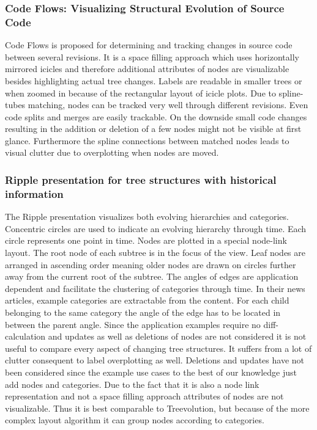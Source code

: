 \subsubsection{Code Flows: Visualizing Structural Evolution of Source Code\cite{telea2008code}}
Code Flows is proposed for determining and tracking changes in source code between several revisions. It is a space filling approach which uses horizontally mirrored icicles and therefore additional attributes of nodes are visualizable besides highlighting actual tree changes. Labels are readable in smaller trees or when zoomed in because of the rectangular layout of icicle plots. Due to spline-tubes matching, nodes can be tracked very well through different revisions. Even code splits and merges are easily trackable. On the downside small code changes resulting in the addition or deletion of a few nodes might not be visible at first glance. Furthermore the spline connections between matched nodes leads to visual clutter due to overplotting when nodes are moved.


\subsubsection{Ripple presentation for tree structures with historical information\cite{ishihara2006ripple}}
The Ripple presentation visualizes both evolving hierarchies and categories. Concentric circles are used to indicate an evolving hierarchy through time. Each circle represents one point in time. Nodes are plotted in a special node-link layout. The root node of each subtree is in the focus of the view. Leaf nodes are arranged in ascending order meaning older nodes are drawn on circles further away from the current root of the subtree. The angles of edges are application dependent and facilitate the clustering of categories through time. In their news articles, example categories are extractable from the content. For each child belonging to the same category the angle of the edge has to be located in between the parent angle. Since the application examples require no diff-calculation and updates as well as deletions of nodes are not considered it is not useful to compare every aspect of changing tree structures. It suffers from a lot of clutter consequent to label overplotting as well. Deletions and updates have not been considered since the example use cases to the best of our knowledge just add nodes and categories. Due to the fact that it is also a node link representation and not a space filling approach attributes of nodes are not visualizable. Thus it is best comparable to Treevolution, but because of the more complex layout algorithm it can group nodes according to categories. 

